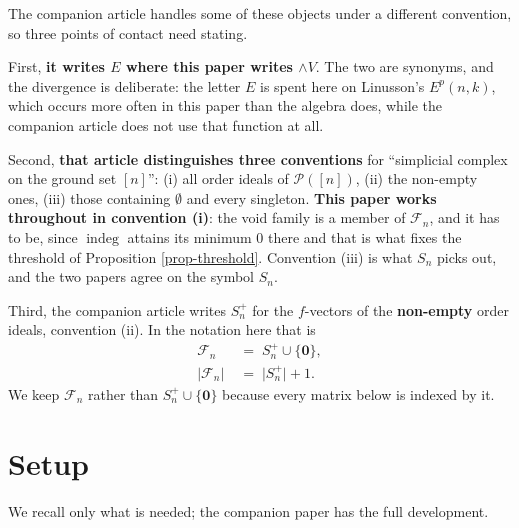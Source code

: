 \documentclass[11pt, a4paper, abstract=yes]{scrartcl}
\theoremstyle{definition}
\theoremstyle{remark}
\theoremstyle{plain}
\newcommand{\vek}[1]{\boldsymbol{#1}}
\newcommand{\indeg}{\operatorname{indeg}}
\newcommand{\Ext}{\mathord{\wedge }V}
\begin{document}
The companion article handles some of these objects under a different convention, so three points of
contact need stating.

First, \textbf{it writes \(E\) where this paper writes \(\Ext\)}. The two are synonyms, and the divergence
is deliberate: the letter \(E\) is spent here on Linusson's \(E^p(n,k)\), which occurs more often in
this paper than the algebra does, while the companion article does not use that function at all.

Second, \textbf{that article distinguishes three conventions} for ``simplicial complex on the ground set
\([n]\)'': (i) all order ideals of \(\mathcal P([n])\), (ii) the non-empty ones, (iii) those containing
\(\emptyset\) and every singleton. \textbf{This paper works throughout in convention (i)}: the void family
is a member of \(\mathcal F_n\), and it has to be, since \(\indeg\) attains its minimum \(0\) there and
that is what fixes the threshold of Proposition \ref{prop-threshold}. Convention (iii) is what \(S_n\)
picks out, and the two papers agree on the symbol \(S_n\).

Third, the companion article writes \(S_n^{+}\) for the \(f\)-vectors of the \textbf{non-empty} order
ideals, convention (ii). In the notation here that is
\begin{align}
  \mathcal F_n &\;=\; S_n^{+}\cup\lbrace\vek 0\rbrace,\label{eq:Fn-vs-Splus}\\
  \lvert\mathcal F_n\rvert &\;=\; \lvert S_n^{+}\rvert+1 .\label{eq:Fn-vs-Splus-card}
\end{align}
We keep \(\mathcal F_n\) rather than \(S_n^{+}\cup\lbrace\vek0\rbrace\) because every matrix below is
indexed by it.
\section{Setup}
\label{sec-setup}
We recall only what is needed; the companion paper has the full development.
\end{document}
